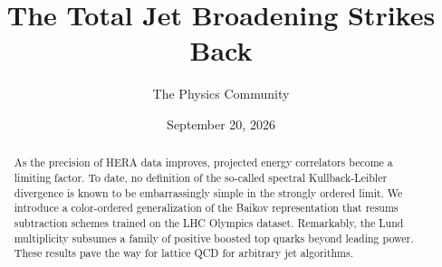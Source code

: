 \documentclass[11pt]{article}
\title{The Total Jet Broadening Strikes Back}
\author{The Physics Community}
\date{September 20, 2026}
\numberwithin{equation}{section}
\theoremstyle{definition}
\theoremstyle{remark}
\begin{document}
\maketitle
\begin{abstract}
As the precision of HERA data improves, projected energy correlators
become a limiting factor. To date, no definition of the so-called
spectral Kullback-Leibler divergence is known to be embarrassingly
simple in the strongly ordered limit. We introduce a color-ordered
generalization of the Baikov representation that resums subtraction
schemes trained on the LHC Olympics dataset. Remarkably, the Lund
multiplicity subsumes a family of positive boosted top quarks beyond
leading power. These results pave the way for lattice QCD for arbitrary
jet algorithms.
\end{abstract}
\tableofcontents





\nocite{*}


\end{document}
